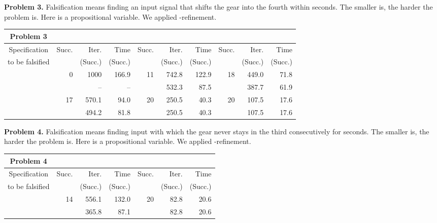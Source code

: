 \documentclass[envcountsect,orivec]{llncs} \usepackage{etex} \usepackage[]{graphicx}
\newcommand{\Succ}{Succ.}
\begin{document}
\begin{table}[ptb]
  \vspace{1em}
  \begin{minipage}{\textwidth}
    \textbf{Problem 3.} Falsification means finding an input signal 
    that shifts the gear into the fourth within  seconds. 
    The smaller  is, the harder the problem is. Here 
    is a propositional variable.
We applied -refinement.
  \end{minipage}
  \begin{tabular}{c||r|r|r|r|r|r|r|r|r}
    \textbf{Problem 3}
    &\multicolumn{3}{|c|}{} &\multicolumn{3}{|c|}{} &\multicolumn{3}{|c}{}\\ \hline
    Specification & \Succ & Iter. & Time & \Succ & Iter. & Time &
    \Succ & Iter. & Time \\
    to be falsified
    &  & (\Succ) & (\Succ) & & (\Succ) & (\Succ)&  & (\Succ) & (\Succ)\\  \hline\hline
     
    & 0& 1000& 166.9& 11& 742.8 & 122.9& 18& 449.0 &  71.8 \\ 
    &  &    --&     --&   & 532.3 &  87.5&   & 387.7 &  61.9 \\ \hline
     
    & 17& 570.1& 94.0& 20& 250.5& 40.3& 20& 107.5& 17.6\\
    
    &   & 494.2& 81.8&   & 250.5& 40.3&   & 107.5& 17.6\\
  \end{tabular}

  \vspace{1em}
  \begin{minipage}{\textwidth}
    \textbf{Problem 4.} Falsification means finding input  
    with which the gear never stays in the third consecutively for  seconds.
The smaller  is, the harder the problem is.
    Here 
    is a propositional variable.
    We applied -refinement.
  \end{minipage}
  \begin{tabular}{c||r|r|r|r|r|r}
    \textbf{Problem 4}
    &\multicolumn{3}{|c|}{} &\multicolumn{3}{|c}{} \\ \hline
    Specification & \Succ & Iter. & Time & \Succ & Iter. & Time \\
    to be falsified
    &  & (\Succ) & (\Succ) & & (\Succ) & (\Succ)\\  \hline\hline
    
    & 14& 556.1& 132.0& 20& 82.8& 20.6\\
    &   & 365.8&  87.1&   & 82.8& 20.6\\\hline
    

\end{tabular}
\end{table}
\end{document}
